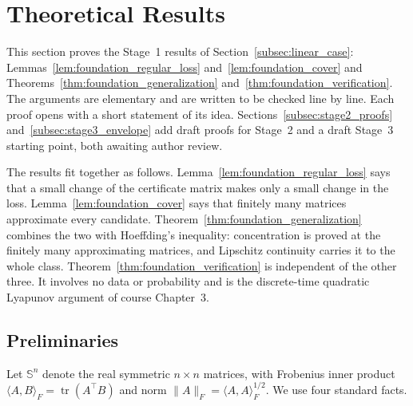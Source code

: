 \section{Theoretical Results}
\label{sec:theory}

This section proves the Stage~1 results of
Section~\ref{subsec:linear_case}:
Lemmas~\ref{lem:foundation_regular_loss} and~\ref{lem:foundation_cover}
and Theorems~\ref{thm:foundation_generalization}
and~\ref{thm:foundation_verification}. The arguments are elementary and
are written to be checked line by line. Each proof opens with a short
statement of its idea. Sections~\ref{subsec:stage2_proofs}
and~\ref{subsec:stage3_envelope} add draft proofs for Stage~2 and a draft
Stage~3 starting point, both awaiting author review.

The results fit together as follows. Lemma~\ref{lem:foundation_regular_loss}
says that a small change of the certificate matrix makes only a small change
in the loss. Lemma~\ref{lem:foundation_cover} says that finitely many
matrices approximate every candidate. Theorem~\ref{thm:foundation_generalization}
combines the two with Hoeffding's inequality: concentration is proved at the
finitely many approximating matrices, and Lipschitz continuity carries it to
the whole class. Theorem~\ref{thm:foundation_verification} is independent of
the other three. It involves no data or probability and is the discrete-time
quadratic Lyapunov argument of course Chapter~3.

\subsection{Preliminaries}
\label{subsec:theory_prelims}

Let $\mathbb S^n$ denote the real symmetric $n\times n$ matrices, with
Frobenius inner product $\langle A,B\rangle_F=\operatorname{tr}(A^\top B)$
and norm $\|A\|_F=\langle A,A\rangle_F^{1/2}$. We use four standard facts.

